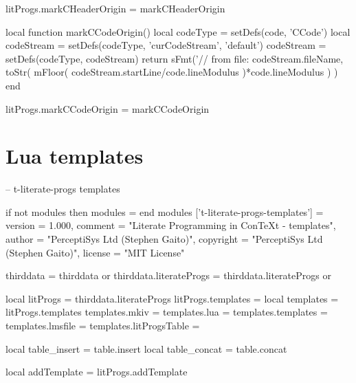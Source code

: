 litProgs.markCHeaderOrigin = markCHeaderOrigin

local function markCCodeOrigin()
  local codeType       = setDefs(code, 'CCode')
  local codeStream     = setDefs(codeType, 'curCodeStream', 'default')
  codeStream           = setDefs(codeType, codeStream)
  return sFmt('// from file: %
    codeStream.fileName,
    toStr(
      mFloor(
        codeStream.startLine/code.lineModulus
      )*code.lineModulus
    )
  )
end

litProgs.markCCodeOrigin = markCCodeOrigin
\stopLuaCode

\setLitProgsOriginMarker[MkIVCode][markMkIVCodeOrigin]
\setLitProgsOriginMarker[MpIVCode][markMpIVCodeOrigin]
\setLitProgsOriginMarker[LuaCode][markLuaCodeOrigin]
\setLitProgsOriginMarker[LuaTemplate][markLuaTemplateOrigin]

\section{Lua templates}

\startLuaTemplate
-- t-literate-progs templates

if not modules then modules = { } end
modules ['t-literate-progs-templates'] = {
    version   = 1.000,
    comment   = "Literate Programming in ConTeXt - templates",
    author    = "PerceptiSys Ltd (Stephen Gaito)",
    copyright = "PerceptiSys Ltd (Stephen Gaito)",
    license   = "MIT License"
}

thirddata               = thirddata               or {}
thirddata.literateProgs = thirddata.literateProgs or {}

local litProgs          = thirddata.literateProgs
litProgs.templates      = {}
local templates         = litProgs.templates
templates.mkiv          = {}
templates.lua           = {}
templates.templates     = {}
templates.lmsfile       = {}
templates.litProgsTable = {}

local table_insert = table.insert
local table_concat = table.concat

local addTemplate = litProgs.addTemplate
\stopLuaTemplate


\stopchapter
